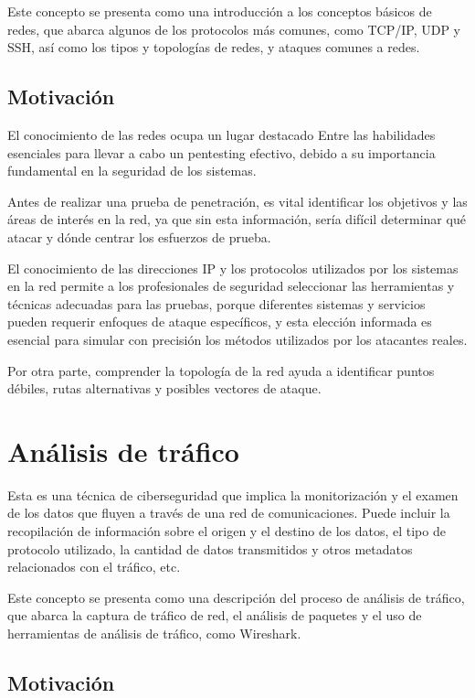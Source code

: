         Este concepto se presenta como una introducción a los conceptos básicos de redes, que abarca algunos de los protocolos más comunes, como TCP/IP, UDP y SSH, así como los tipos y topologías de redes, y ataques comunes a redes.

        \subsection{Motivación}

            El conocimiento de las redes ocupa un lugar destacado Entre las habilidades esenciales para llevar a cabo un pentesting efectivo, debido a su importancia fundamental en la seguridad de los sistemas.

            Antes de realizar una prueba de penetración, es vital identificar los objetivos y las áreas de interés en la red, ya que sin esta información, sería difícil determinar qué atacar y dónde centrar los esfuerzos de prueba.

            El conocimiento de las direcciones IP y los protocolos utilizados por los sistemas en la red permite a los profesionales de seguridad seleccionar las herramientas y técnicas adecuadas para las pruebas, porque diferentes sistemas y servicios pueden requerir enfoques de ataque específicos, y esta elección informada es esencial para simular con precisión los métodos utilizados por los atacantes reales.

            Por otra parte, comprender la topología de la red ayuda a identificar puntos débiles, rutas alternativas y posibles vectores de ataque.
        

    \section{Análisis de tráfico}

        Esta es una técnica de ciberseguridad que implica la monitorización y el examen de los datos que fluyen a través de una red de comunicaciones. Puede incluir la recopilación de información sobre el origen y el destino de los datos, el tipo de protocolo utilizado, la cantidad de datos transmitidos y otros metadatos relacionados con el tráfico, etc.

        Este concepto se presenta como una descripción del proceso de análisis de tráfico, que abarca la captura de tráfico de red, el análisis de paquetes y el uso de herramientas de análisis de tráfico, como Wireshark.

        \subsection{Motivación}

